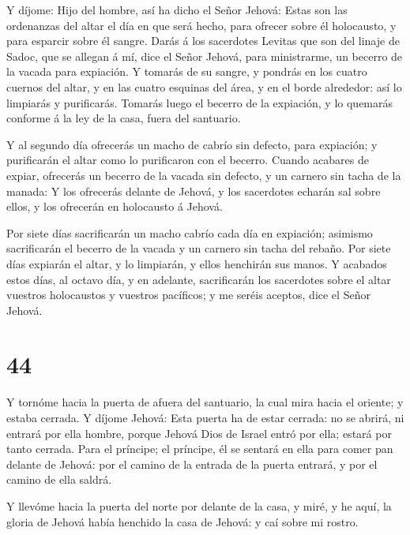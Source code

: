  Y díjome: Hijo del hombre, así ha dicho el Señor Jehová:
Estas son las ordenanzas del altar el día en que será hecho, para
ofrecer sobre él holocausto, y para esparcir sobre él sangre.
 Darás á los sacerdotes Levitas que son del linaje de
Sadoc, que se allegan á mí, dice el Señor Jehová, para ministrarme, un
becerro de la vacada para expiación.  Y tomarás de su
sangre, y pondrás en los cuatro cuernos del altar, y en las cuatro
esquinas del área, y en el borde alrededor: así lo limpiarás y
purificarás.  Tomarás luego el becerro de la expiación, y
lo quemarás conforme á la ley de la casa, fuera del santuario.

 Y al segundo día ofrecerás un macho de cabrío sin defecto,
para expiación; y purificarán el altar como lo purificaron con el
becerro.  Cuando acabares de expiar, ofrecerás un becerro
de la vacada sin defecto, y un carnero sin tacha de la manada:
 Y los ofrecerás delante de Jehová, y los sacerdotes
echarán sal sobre ellos, y los ofrecerán en holocausto á Jehová.

 Por siete días sacrificarán un macho cabrío cada día en
expiación; asimismo sacrificarán el becerro de la vacada y un carnero
sin tacha del rebaño.  Por siete días expiarán el altar, y
lo limpiarán, y ellos henchirán sus manos.  Y acabados
estos días, al octavo día, y en adelante, sacrificarán los sacerdotes
sobre el altar vuestros holocaustos y vuestros pacíficos; y me seréis
aceptos, dice el Señor Jehová.

\hypertarget{section-43}{%
\section{44}\label{section-43}}

 Y tornóme hacia la puerta de afuera del santuario, la cual
mira hacia el oriente; y estaba cerrada.  Y díjome Jehová:
Esta puerta ha de estar cerrada: no se abrirá, ni entrará por ella
hombre, porque Jehová Dios de Israel entró por ella; estará por tanto
cerrada.  Para el príncipe; el príncipe, él se sentará en
ella para comer pan delante de Jehová: por el camino de la entrada de la
puerta entrará, y por el camino de ella saldrá.

 Y llevóme hacia la puerta del norte por delante de la casa,
y miré, y he aquí, la gloria de Jehová había henchido la casa de Jehová:
y caí sobre mi rostro.

